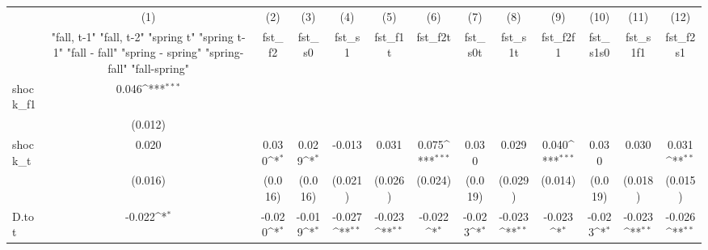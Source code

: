 {
\def\sym#1{\ifmmode^{#1}\else\(^{#1}\)\fi}
\begin{tabular}{l*{12}{c}}
\toprule
            &\multicolumn{1}{c}{(1)}&\multicolumn{1}{c}{(2)}&\multicolumn{1}{c}{(3)}&\multicolumn{1}{c}{(4)}&\multicolumn{1}{c}{(5)}&\multicolumn{1}{c}{(6)}&\multicolumn{1}{c}{(7)}&\multicolumn{1}{c}{(8)}&\multicolumn{1}{c}{(9)}&\multicolumn{1}{c}{(10)}&\multicolumn{1}{c}{(11)}&\multicolumn{1}{c}{(12)}\\
            &\multicolumn{1}{c}{  "fall, t-1" "fall, t-2" "spring t" "spring t-1"  "fall - fall" "spring - spring" "spring-fall" "fall-spring" }&\multicolumn{1}{c}{fst\_f2}&\multicolumn{1}{c}{fst\_s0}&\multicolumn{1}{c}{fst\_s1}&\multicolumn{1}{c}{fst\_f1t}&\multicolumn{1}{c}{fst\_f2t}&\multicolumn{1}{c}{fst\_s0t}&\multicolumn{1}{c}{fst\_s1t}&\multicolumn{1}{c}{fst\_f2f1}&\multicolumn{1}{c}{fst\_s1s0}&\multicolumn{1}{c}{fst\_s1f1}&\multicolumn{1}{c}{fst\_f2s1}\\
\midrule
shock\_f1    &       0.046\sym{***}&                     &                     &                     &                     &                     &                     &                     &                     &                     &                     &                     \\
            &     (0.012)         &                     &                     &                     &                     &                     &                     &                     &                     &                     &                     &                     \\
\addlinespace
shock\_t     &       0.020         &       0.030\sym{*}  &       0.029\sym{*}  &      -0.013         &       0.031         &       0.075\sym{***}&       0.030         &       0.029         &       0.040\sym{***}&       0.030         &       0.030         &       0.031\sym{**} \\
            &     (0.016)         &     (0.016)         &     (0.016)         &     (0.021)         &     (0.026)         &     (0.024)         &     (0.019)         &     (0.029)         &     (0.014)         &     (0.019)         &     (0.018)         &     (0.015)         \\
\addlinespace
D.tot       &      -0.022\sym{*}  &      -0.020\sym{*}  &      -0.019\sym{*}  &      -0.027\sym{**} &      -0.023\sym{**} &      -0.022\sym{*}  &      -0.023\sym{*}  &      -0.023\sym{**} &      -0.023\sym{*}  &      -0.023\sym{*}  &      -0.023\sym{**} &      -0.026\sym{**} \\

\end{tabular}}
